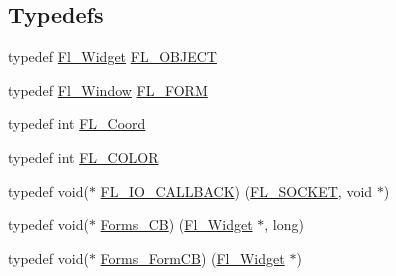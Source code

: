 \subsection*{Typedefs}
\begin{DoxyCompactItemize}
\item 
typedef \hyperlink{class_fl___widget}{Fl\+\_\+\+Widget} \hyperlink{forms_8_h_a6a6a510bc17d8d92f15ad10fdb20cff4}{F\+L\+\_\+\+O\+B\+J\+E\+CT}
\item 
typedef \hyperlink{class_fl___window}{Fl\+\_\+\+Window} \hyperlink{forms_8_h_a551df8f22e152c4d4df331b177171a60}{F\+L\+\_\+\+F\+O\+RM}
\item 
typedef int \hyperlink{forms_8_h_ad5d9ef7d5d82d47b77fd1cc5d6b69315}{F\+L\+\_\+\+Coord}
\item 
typedef int \hyperlink{forms_8_h_a81f3c01a14034a7114ffe01f465e7f4b}{F\+L\+\_\+\+C\+O\+L\+OR}
\item 
typedef void($\ast$ \hyperlink{forms_8_h_aeb392ff48e699b0f1508e16bd4f9f788}{F\+L\+\_\+\+I\+O\+\_\+\+C\+A\+L\+L\+B\+A\+CK}) (\hyperlink{_fl_8_h_a02134b1207d9eb2dce7f6f70e76c199a}{F\+L\+\_\+\+S\+O\+C\+K\+ET}, void $\ast$)
\item 
typedef void($\ast$ \hyperlink{forms_8_h_a93a9878bd5445be5505c060c990ed9e0}{Forms\+\_\+\+CB}) (\hyperlink{class_fl___widget}{Fl\+\_\+\+Widget} $\ast$, long)
\item 
typedef void($\ast$ \hyperlink{forms_8_h_ad97f38473f6f13b5ab389030a4c8887c}{Forms\+\_\+\+Form\+CB}) (\hyperlink{class_fl___widget}{Fl\+\_\+\+Widget} $\ast$)
\end{DoxyCompactItemize}
